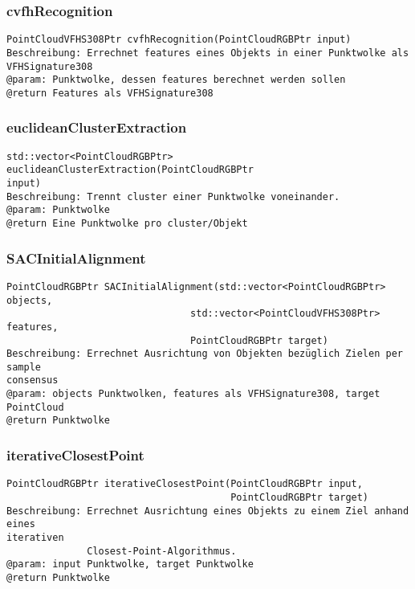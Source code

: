 \documentclass{suturo}
\begin{document}
\subsubsection{cvfhRecognition}
\begin{verbatim}
PointCloudVFHS308Ptr cvfhRecognition(PointCloudRGBPtr input)
Beschreibung: Errechnet features eines Objekts in einer Punktwolke als
VFHSignature308
@param: Punktwolke, dessen features berechnet werden sollen
@return Features als VFHSignature308
\end{verbatim}\label{func:cvfhRecognition}

\subsubsection{euclideanClusterExtraction}
\begin{verbatim}
std::vector<PointCloudRGBPtr> euclideanClusterExtraction(PointCloudRGBPtr
input)
Beschreibung: Trennt cluster einer Punktwolke voneinander.
@param: Punktwolke
@return Eine Punktwolke pro cluster/Objekt
\end{verbatim}\label{func:euclideanClusterExtraction}

\subsubsection{SACInitialAlignment}
\begin{verbatim}
PointCloudRGBPtr SACInitialAlignment(std::vector<PointCloudRGBPtr> objects,
                                std::vector<PointCloudVFHS308Ptr> features,
                                PointCloudRGBPtr target)
Beschreibung: Errechnet Ausrichtung von Objekten bezüglich Zielen per sample
consensus
@param: objects Punktwolken, features als VFHSignature308, target PointCloud
@return Punktwolke
\end{verbatim}\label{func:sacinitialalignment}

\subsubsection{iterativeClosestPoint}
\begin{verbatim}
PointCloudRGBPtr iterativeClosestPoint(PointCloudRGBPtr input,
                                       PointCloudRGBPtr target)
Beschreibung: Errechnet Ausrichtung eines Objekts zu einem Ziel anhand eines
iterativen 
			  Closest-Point-Algorithmus.
@param: input Punktwolke, target Punktwolke
@return Punktwolke
\end{verbatim}\label{func:iterativeClosestPoint}
\end{document}

